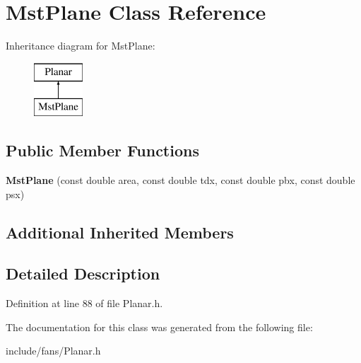 \hypertarget{class_mst_plane}{}\section{Mst\+Plane Class Reference}
\label{class_mst_plane}
Inheritance diagram for Mst\+Plane\+:\begin{figure}[H]
\begin{center}
\leavevmode
\includegraphics[height=2.000000cm]{d5/dd0/class_mst_plane}
\end{center}
\end{figure}
\subsection*{Public Member Functions}
\begin{DoxyCompactItemize}
\item 
\mbox{\label{class_mst_plane_a7ecba572a4fbe043a4d9847c356c9ab5}} 
{\bfseries Mst\+Plane} (const double area, const double tdx, const double pbx, const double psx)
\end{DoxyCompactItemize}
\subsection*{Additional Inherited Members}


\subsection{Detailed Description}


Definition at line 88 of file Planar.\+h.



The documentation for this class was generated from the following file\+:\begin{DoxyCompactItemize}
\item 
include/fans/Planar.\+h\end{DoxyCompactItemize}
